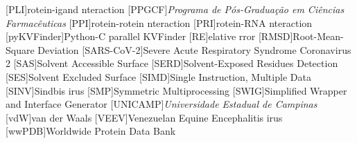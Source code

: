\documentclass[Ingles]{phdthesis}
\begin{document}
\begin{acronym}
  [PLI]{rotein-igand nteraction}
  [PPGCF]{\textit{Programa de Pós-Graduação em Ciências Farmacêuticas}}
  [PPI]{rotein-rotein nteraction}
  [PRI]{rotein-RNA nteraction}
  [pyKVFinder]{Python-C parallel KVFinder}
  [RE]{elative rror}
  [RMSD]{Root-Mean-Square Deviation}
  [SARS-CoV-2]{Severe Acute Respiratory Syndrome Coronavirus 2}
  [SAS]{Solvent Accessible Surface}
  [SERD]{Solvent-Exposed Residues Detection}
  [SES]{Solvent Excluded Surface}
  [SIMD]{Single Instruction, Multiple Data}
  [SINV]{Sindbis irus}
  [SMP]{Symmetric Multiprocessing}
  [SWIG]{Simplified Wrapper and Interface Generator}
  [UNICAMP]{\textit{Universidade Estadual de Campinas}}
  [vdW]{van der Waals}
  [VEEV]{Venezuelan Equine Encephalitis irus}
  [wwPDB]{Worldwide Protein Data Bank}
\end{acronym}

\clearpage



\end{document}
